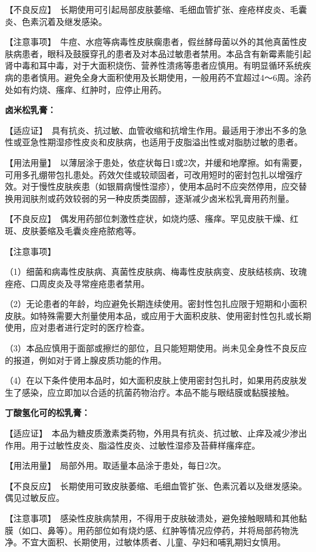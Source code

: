 【不良反应】　长期使用可引起局部皮肤萎缩、毛细血管扩张、痤疮样皮炎、毛囊炎、色素沉着及继发感染。

【注意事项】　牛痘、水痘等病毒性皮肤瘸患者，假丝酵母菌以外的其他真菌性皮肤病患者，眼科及鼓膜穿孔的患者及对本品过敏患者禁用。本品含有新霉素能引起肾中毒和耳中毒，对于大面积烧伤、营养性溃疡等患者应慎用。有明显循环系统疾病的患者慎用。避免全身大面积使用及长期使用，一般用药不宜超过4～6周。涂药处如有灼烧、瘙痒、红肿时，应停止用药。

\textbf{卤米松乳膏：}

【适应证】　具有抗炎、抗过敏、血管收缩和抗增生作用。最适用于渗出不多的急性或亚急性期湿疹性皮炎和皮肤病，也适用于皮脂溢出性或对脂肪过敏的患者。

【用法用量】　以薄层涂于患处，依症状每日1或2次，并缓和地摩擦。如有需要，可用多孔绷带包扎患处。药效欠佳或较顽固者，可改用短时的密封包扎以增强疗效。对于慢性皮肤疾患（如银屑病慢性湿疹），使用本品时不应突然停用，应交替换用润肤剂或药效较弱的另一种皮质类固醇，逐渐减少卤米松乳膏用药剂量。

【不良反应】　偶发用药部位刺激性症状，如烧灼感、瘙痒。罕见皮肤干燥、红斑、皮肤萎缩及毛囊炎痤疮脓疱等。

【注意事项】

（1）细菌和病毒性皮肤病、真菌性皮肤病、梅毒性皮肤病变、皮肤结核病、玫瑰痤疮、口周皮炎及寻常痤疮患者禁用。

（2）无论患者的年龄，均应避免长期连续使用。密封性包扎应限于短期和小面积皮肤。如特殊需要大剂量使用本品，或应用于大面积皮肤、使用密封性包扎或长期使用，应对患者进行定时的医疗检查。

（3）本品应慎用于面部或擦烂的部位，且只能短期使用。尚未见全身性不良反应的报道，例如对于肾上腺皮质功能的作用。

（4）在以下条件使用本品时，如大面积皮肤上使用密封包扎时，如果用药皮肤发生了感染，应立即加以合适的抗菌药物治疗。本品不能与眼结膜或黏膜接触。

\textbf{丁酸氢化可的松乳膏：}

【适应证】　本品为糖皮质激素类药物，外用具有抗炎、抗过敏、止痒及减少渗出作用。用于过敏性皮炎、脂溢性皮炎、过敏性湿疹及苔藓样瘙痒症。

【用法用量】　局部外用。取适量本品涂于患处，每日2次。

【不良反应】　长期使用可致皮肤萎缩、毛细血管扩张、色素沉着以及继发感染。偶见过敏反应。

【注意事项】　感染性皮肤病禁用，不得用于皮肤破溃处，避免接触眼睛和其他黏膜（如口、鼻等）。用药部位如有烧灼感、红肿等情况应停药，并将局部药物洗净。不宜大面积、长期使用，过敏体质者、儿童、孕妇和哺乳期妇女慎用。

